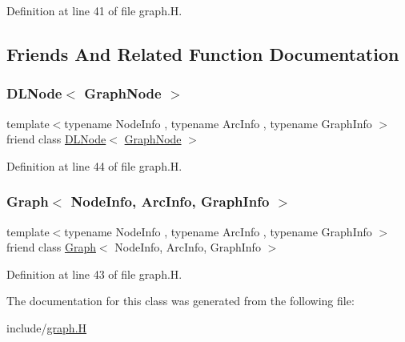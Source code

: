 Definition at line 41 of file graph.\+H.



\subsection{Friends And Related Function Documentation}
\mbox{\label{class_designar_1_1_graph_node_a5d0e7b51039a0eb5cfdfdb2f3701f06d}} 
\subsubsection{\texorpdfstring{D\+L\+Node$<$ Graph\+Node $>$}{DLNode< GraphNode >}}
{\footnotesize\ttfamily template$<$typename Node\+Info , typename Arc\+Info , typename Graph\+Info $>$ \\
friend class \hyperlink{class_designar_1_1_d_l_node}{D\+L\+Node}$<$ \hyperlink{class_designar_1_1_graph_node}{Graph\+Node} $>$\hspace{0.3cm}{\ttfamily [friend]}}



Definition at line 44 of file graph.\+H.

\mbox{\label{class_designar_1_1_graph_node_a0a9834688687d864501bbb9c85b0d32c}} 
\subsubsection{\texorpdfstring{Graph$<$ Node\+Info, Arc\+Info, Graph\+Info $>$}{Graph< NodeInfo, ArcInfo, GraphInfo >}}
{\footnotesize\ttfamily template$<$typename Node\+Info , typename Arc\+Info , typename Graph\+Info $>$ \\
friend class \hyperlink{class_designar_1_1_graph}{Graph}$<$ Node\+Info, Arc\+Info, Graph\+Info $>$\hspace{0.3cm}{\ttfamily [friend]}}



Definition at line 43 of file graph.\+H.



The documentation for this class was generated from the following file\+:\begin{DoxyCompactItemize}
\item 
include/\hyperlink{graph_8_h}{graph.\+H}\end{DoxyCompactItemize}
